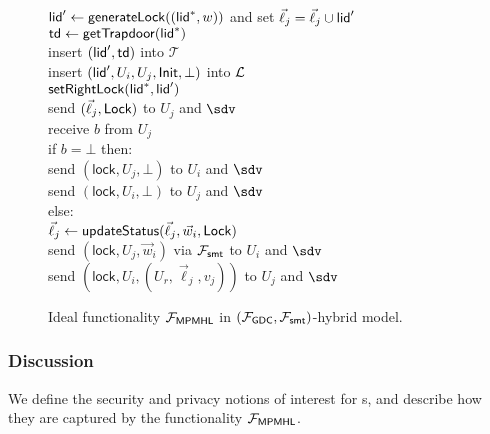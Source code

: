 \begin{figure*}[!h]
{\begin{minipage}[t]{0.45\textwidth}
{				\quad $\mathsf{lid}' \gets \mathsf{generateLock}((\mathsf{lid}^*,w))$ and set $\vec{\ell}_j = \vec{\ell}_j \cup \mathsf{lid}'$													\\
				\quad $\mathsf{td} \gets \mathsf{getTrapdoor}(\mathsf{lid}^*)$								\\
				\quad insert $(\mathsf{lid}',\mathsf{td})$ into $\mathcal{T}$								\\
				\quad insert $(\mathsf{lid}', U_i, U_j, \mathsf{Init}, \bot)$ into $\mathcal{L}$						\\
				\quad $\mathsf{setRightLock}(\mathsf{lid}^*, \mathsf{lid}')$											\\
				send $(\vec{\ell}_j, \mathsf{Lock})$ to $U_j$ and $\sdv$								\\
				receive $b$ from $U_j$														\\
				if $b = \bot$ then: 															\\
				\quad send $(\mathsf{lock},U_j,\bot)$ to $U_i$ and $\sdv$					\\
				\quad send $(\mathsf{lock},U_i,\bot)$ to $U_j$ and $\sdv$					\\	
				else:																		\\
				\quad $\vec{\ell}_j \gets \mathsf{updateStatus}(\vec{\ell}_j, \vec{w}_i, \mathsf{Lock})$	\\
				\quad send $(\mathsf{lock},U_j,\vec{w}_i)$ via $\mathcal{F}_{\mathsf{smt}}$ to $U_i$ 
				and $\sdv$																	\\
				\quad send $(\mathsf{lock},U_i,(U_r,\vec{\ell}_j,v_j))$ to $U_j$ and $\sdv$
			}
			\\
		\end{minipage}
	}	
	\caption{Ideal functionality $\mathcal{F}_{\mathsf{MPMHL}}$ in $(\mathcal{F}_{\mathsf{GDC}}, \mathcal{F}_{\mathsf{smt}})$-hybrid model.}
	\label{fig:ideal-mpmhl}
\end{figure*}


\subsubsection{Discussion}
\label{sec:mpmhl-discussion}

We define the security and privacy notions of interest for {\sysname}s, and describe how they 
are captured by the functionality $\mathcal{F}_{\mathsf{MPMHL}}$.



